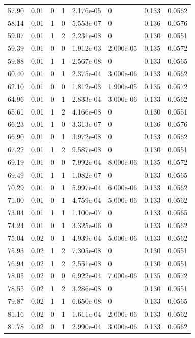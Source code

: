 \documentclass[preview]{standalone}
\begin{document}
{{{\begin{tabular}{L{1.2cm}C{1.2cm} C{0.3cm}C{0.5cm} C{1.4cm}C{1.4cm} C{1.4cm}C{1.4cm}}
  57.90  &  0.01  & 0     &  1 &  2.176e-05  & 0  & 0.133 &  0.0562   \\ 
  58.14  &  0.01  & 1     &  0 &  5.553e-07  & 0  & 0.136 &  0.0576   \\ 
  59.07  &  0.01  & 1     &  2 &  2.231e-08  & 0  & 0.130 &  0.0551   \\ 
  59.39  &  0.01  & 0     &  0 &  1.912e-03  & 2.000e-05  & 0.135 &  0.0572   \\ 
  59.88  &  0.01  & 1     &  1 &  2.567e-08  & 0  & 0.133 &  0.0565   \\ 
  60.40  &  0.01  & 0     &  1 &  2.375e-04  & 3.000e-06  & 0.133 &  0.0562   \\ 
  62.10  &  0.01  & 0     &  0 &  1.812e-03  & 1.900e-05  & 0.135 &  0.0572   \\ 
  64.96  &  0.01  & 0     &  1 &  2.833e-04  & 3.000e-06  & 0.133 &  0.0562   \\ 
  65.61  &  0.01  & 1     &  2 &  4.166e-08  & 0  & 0.130 &  0.0551   \\ 
  66.23  &  0.01  & 1     &  0 &  3.313e-07  & 0  & 0.136 &  0.0576   \\ 
  66.90  &  0.01  & 0     &  1 &  3.972e-08  & 0  & 0.133 &  0.0562   \\ 
  67.22  &  0.01  & 1     &  2 &  9.587e-08  & 0  & 0.130 &  0.0551   \\ 
  69.19  &  0.01  & 0     &  0 &  7.992e-04  & 8.000e-06  & 0.135 &  0.0572   \\ 
  69.49  &  0.01  & 1     &  1 &  1.082e-07  & 0  & 0.133 &  0.0565   \\ 
  70.29  &  0.01  & 0     &  1 &  5.997e-04  & 6.000e-06  & 0.133 &  0.0562   \\ 
  71.00  &  0.01  & 0     &  1 &  4.759e-04  & 5.000e-06  & 0.133 &  0.0562   \\ 
  73.04  &  0.01  & 1     &  1 &  1.100e-07  & 0  & 0.133 &  0.0565   \\ 
  74.24  &  0.01  & 0     &  1 &  3.325e-06  & 0  & 0.133 &  0.0562   \\ 
  75.04  &  0.02  & 0     &  1 &  4.939e-04  & 5.000e-06  & 0.133 &  0.0562   \\ 
  75.93  &  0.02  & 1     &  2 &  7.305e-08  & 0  & 0.130 &  0.0551   \\ 
  76.94  &  0.02  & 1     &  2 &  2.551e-08  & 0  & 0.130 &  0.0551   \\ 
  78.05  &  0.02  & 0     &  0 &  6.922e-04  & 7.000e-06  & 0.135 &  0.0572   \\ 
  78.55  &  0.02  & 1     &  2 &  3.286e-08  & 0  & 0.130 &  0.0551   \\ 
  79.87  &  0.02  & 1     &  1 &  6.650e-08  & 0  & 0.133 &  0.0565   \\ 
  81.16  &  0.02  & 0     &  1 &  1.611e-04  & 2.000e-06  & 0.133 &  0.0562   \\ 
  81.78  &  0.02  & 0     &  1 &  2.990e-04  & 3.000e-06  & 0.133 &  0.0562   \\ 
\hline 
\end{tabular} 

}}}
\end{document}
